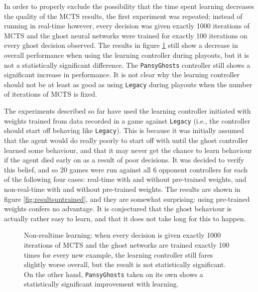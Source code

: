 In order to properly exclude the possibility that the time spent learning decreases the quality of the MCTS results, the first experiment was repeated; instead of running in real-time however, every decision was given exactly 1000 iterations of MCTS and the ghost neural networks were trained for exactly 100 iterations on every ghost decision observed.  The results in figure \ref{fig:resultsrealtime} still show a decrease in overall performance when using the learning controller during playouts, but it is not a statistically significant difference.  The {\tt PansyGhosts} controller still shows a significant increase in performance.  It is not clear why the learning controller should not be at least as good as using {\tt Legacy} during playouts when the number of iterations of MCTS is fixed.

The experiments described so far have used the learning controller initiated with weights trained from data recorded in a game against {\tt Legacy} (i.e., the controller should start off behaving like {\tt Legacy}).  This is because it was initially assumed that the agent would do really poorly to start off with until the ghost controller learned some behaviour, and that it may never get the chance to learn behaviour if the agent died early on as a result of poor decisions.  It was decided to verify this belief, and so 20 games were run against all 6 opponent controllers for each of the following four cases: real-time with and without pre-trained weights, and non-real-time with and without pre-trained weights.  The results are shown in figure \ref{fig:resultsuntrained}, and they are somewhat surprising: using pre-trained weights confers no advantage.  It is conjectured that the ghost behaviour is actually rather easy to learn, and that it does not take long for this to happen.

\begin{figure}
\centering
{}
\caption[Non-realtime learning]{Non-realtime learning: when every decision is given exactly 1000 iterations of MCTS and the ghost networks are trained exactly 100 times for every new example, the learning controller still fares slightly worse overall, but the result is not statistically significant.  On the other hand, {\tt PansyGhosts} taken on its own shows a statistically significant improvement with learning.}
\label{fig:resultsrealtime}
\end{figure}

